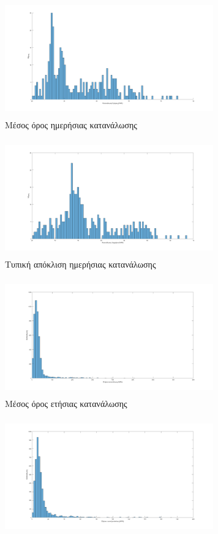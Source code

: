 \begin{figure}
 \begin{subfigure}[b]{0.5\textwidth}
 \includegraphics[width=90mm, height=50mm]{../../plots/Consumption_Analysis/gr_hist_mean_days.png}
\caption{Μέσος όρος ημερήσιας κατανάλωσης}
\label{fig:histmeandays}
 \end{subfigure}
\quad
 \begin{subfigure}[b]{0.5\textwidth}
 	\includegraphics[width=90mm, height=50mm]{../../plots/Consumption_Analysis/gr_hist_std_days.png}
	\caption{Τυπική απόκλιση ημερήσιας κατανάλωσης}
	\label{fig:histstddays}
	\end{subfigure}
\quad
 \begin{subfigure}[b]{0.5\textwidth}
 \includegraphics[width=90mm, height=50mm]{../../plots/Consumption_Analysis/gr_hist_mean_year.png}
\caption{Μέσος όρος ετήσιας κατανάλωσης}
\label{fig:histmeanyear}
 \end{subfigure}
\quad
 \begin{subfigure}[b]{0.5\textwidth}
 	\includegraphics[width=90mm, height=50mm]{../../plots/Consumption_Analysis/gr_hist_std_year.png}

\end{subfigure}
\end{figure}
